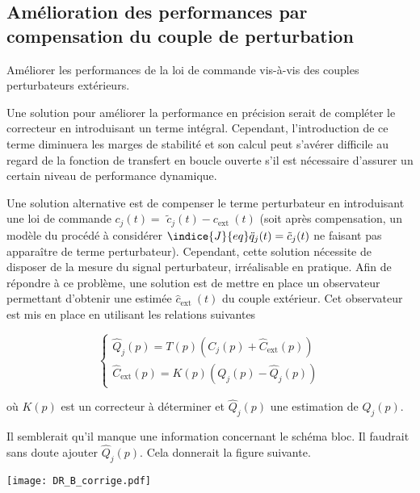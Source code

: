 \subsection{Amélioration des performances par compensation du couple de perturbation}
\begin{obj}
Améliorer les performances de la loi de commande vis-à-vis des couples perturbateurs extérieurs.
\end{obj}

Une solution pour améliorer la performance en précision serait de compléter le correcteur en introduisant un terme intégral. Cependant, l'introduction de ce terme diminuera les marges de stabilité et son calcul peut s'avérer difficile au regard de la fonction de transfert en boucle ouverte s'il est nécessaire d'assurer un certain niveau de performance dynamique.

Une solution alternative est de compenser le terme perturbateur en introduisant une loi de commande $c_{j}(t)=$ $\tilde{c}_{j}(t)-c_{\text {ext }}(t)$ (soit après compensation, un modèle du procédé à considérer $\indice{J}{eq} \ddot{q}_{j}(t)=\tilde{c}_{j}(t)$ ne faisant pas apparaître de terme perturbateur). Cependant, cette solution nécessite de disposer de la mesure du signal perturbateur, irréalisable en pratique. Afin de répondre à ce problème, une solution est de mettre en place un observateur permettant d'obtenir une estimée $\hat{c}_{\text {ext }}(t)$ du couple extérieur. Cet observateur est mis en place en utilisant les relations suivantes

$$
\left\{\begin{array}{l}
\hat{Q}_{j}(p)=T(p)\left(C_{j}(p)+\hat{C}_{\mathrm{ext}}(p)\right) \\
\hat{C}_{\mathrm{ext}}(p)=K(p)\left(Q_{j}(p)-\hat{Q}_{j}(p)\right)
\end{array}\right.
$$

où $K(p)$ est un correcteur à déterminer et $\hat{Q}_{j}(p)$ une estimation de $Q_{j}(p)$.\\

\ifprof
\begin{corrige}
\begin{rem}
Il semblerait qu'il manque une information concernant le schéma bloc. Il faudrait sans doute ajouter $\hat{Q}_j(p)$. Cela donnerait la figure suivante.
\end{rem}

\begin{center}
\texttt{[image: DR\_B\_corrige.pdf]}
\end{center}
\end{corrige}
\else
\fi


